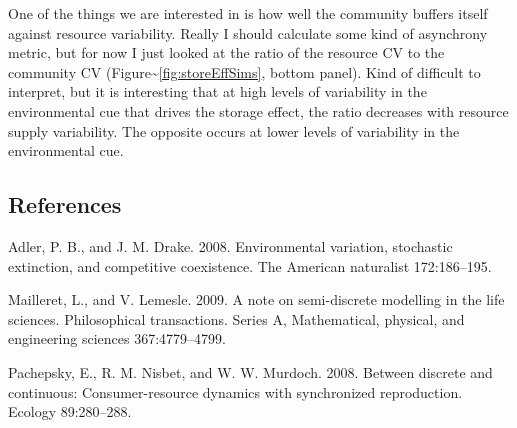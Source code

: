 \documentclass[12pt,]{article}
\begin{document}
One of the things we are interested in is how well the community buffers
itself against resource variability. Really I should calculate some kind
of asynchrony metric, but for now I just looked at the ratio of the
resource CV to the community CV
(Figure\textasciitilde{}\ref{fig:storeEffSims}, bottom panel). Kind of
difficult to interpret, but it is interesting that at high levels of
variability in the environmental cue that drives the storage effect, the
ratio decreases with resource supply variability. The opposite occurs at
lower levels of variability in the environmental cue.

\pagebreak{}

\subsection*{References}\label{references}

Adler, P. B., and J. M. Drake. 2008. Environmental variation, stochastic
extinction, and competitive coexistence. The American naturalist
172:186--195.

Mailleret, L., and V. Lemesle. 2009. A note on semi-discrete modelling
in the life sciences. Philosophical transactions. Series A,
Mathematical, physical, and engineering sciences 367:4779--4799.

Pachepsky, E., R. M. Nisbet, and W. W. Murdoch. 2008. Between discrete
and continuous: Consumer-resource dynamics with synchronized
reproduction. Ecology 89:280--288.
\end{document}

